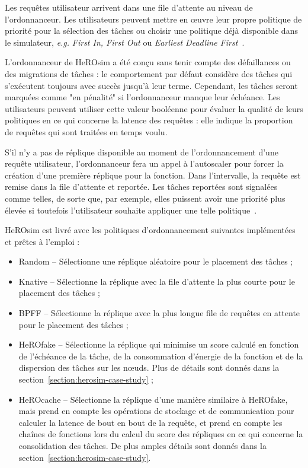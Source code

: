 Les requêtes utilisateur arrivent dans une file d'attente au niveau de l'ordonnanceur. Les utilisateurs peuvent mettre en œuvre leur propre politique de priorité pour la sélection des tâches ou choisir une politique déjà disponible dans le simulateur, \textit{e.g.} \textit{First In, First Out} ou \textit{Earliest Deadline First}~\cite{herofake}.

L'ordonnanceur de HeROsim a été conçu sans tenir compte des défaillances ou des migrations de tâches : le comportement par défaut considère des tâches qui s'exécutent toujours avec succès jusqu'à leur terme. Cependant, les tâches seront marquées comme "en pénalité" si l'ordonnanceur manque leur échéance. Les utilisateurs peuvent utiliser cette valeur booléenne pour évaluer la qualité de leurs politiques en ce qui concerne la latence des requêtes : elle indique la proportion de requêtes qui sont traitées en temps voulu.

S'il n'y a pas de réplique disponible au moment de l'ordonnancement d'une requête utilisateur, l'ordonnanceur fera un appel à l'autoscaler pour forcer la création d'une première réplique pour la fonction. Dans l'intervalle, la requête est remise dans la file d'attente et reportée. Les tâches reportées sont signalées comme telles, de sorte que, par exemple, elles puissent avoir une priorité plus élevée si toutefois l'utilisateur souhaite appliquer une telle politique~\cite{herocache}.

HeROsim est livré avec les politiques d'ordonnancement suivantes implémentées et prêtes à l'emploi :

\begin{itemize}
    \item Random -- Sélectionne une réplique aléatoire pour le placement des tâches ;
    \item Knative -- Sélectionne la réplique avec la file d'attente la plus courte pour le placement des tâches ;
    \item BPFF -- Sélectionne la réplique avec la plus longue file de requêtes en attente pour le placement des tâches ;
    \item HeROfake -- Sélectionne la réplique qui minimise un score calculé en fonction de l'échéance de la tâche, de la consommation d'énergie de la fonction et de la dispersion des tâches sur les nœuds. Plus de détails sont donnés dans la section~\ref{section:herosim-case-study} ;
    \item HeROcache -- Sélectionne la réplique d'une manière similaire à HeROfake, mais prend en compte les opérations de stockage et de communication pour calculer la latence de bout en bout de la requête, et prend en compte les chaînes de fonctions lors du calcul du score des répliques en ce qui concerne la consolidation des tâches. De plus amples détails sont donnés dans la section~\ref{section:herosim-case-study}.
\end{itemize}


